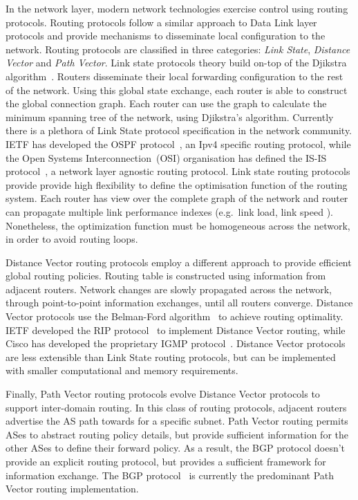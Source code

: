 In the network layer, modern network technologies exercise control using routing
protocols. Routing protocols follow a similar approach to Data Link layer
protocols and provide mechanisms to disseminate local configuration to the
network. Routing protocols are classified in three categories: \emph{Link
  State}, \emph{Distance Vector} and \emph{Path Vector}. Link state protocols
theory build on-top of the Djikstra algorithm~\cite{Djikstra1959}. Routers
disseminate their local forwarding configuration to the rest of the network.
Using this global state exchange, each router is able to construct the global
connection graph. Each router can use the graph to calculate the minimum
spanning tree of the network, using Djikstra's algorithm.  Currently there is a
plethora of Link State protocol specification in the network community.  IETF
has developed the OSPF protocol~\cite{RFC2328}, an Ipv4 specific routing protocol,
while the Open Systems Interconnection~(OSI) organisation has defined the IS-IS
protocol~\cite{RFC1142}, a network layer agnostic routing protocol.  Link state
routing protocols provide provide high flexibility to define the optimisation
function of the routing system.  Each router has view over the complete graph of
the network and router can propagate multiple link performance indexes
(e.g.~link load, link speed ).  Nonetheless, the optimization function must be
homogeneous across the network, in order to avoid routing loops.

Distance Vector routing protocols employ a different approach to provide
efficient global routing policies. Routing table is constructed using
information from adjacent routers. Network changes are slowly propagated across
the network, through point-to-point information exchanges, until all routers
converge.  Distance Vector protocols use the Belman-Ford
algorithm~\cite{bellman1956} to achieve routing optimality. IETF developed the
RIP  protocol~\cite{RFC2453} to implement Distance Vector routing, while Cisco
has developed the proprietary IGMP protocol~\cite{Rutgers1991}. Distance Vector
protocols are less extensible than Link State routing protocols, but can be
implemented with smaller computational and memory requirements.

Finally, Path Vector routing protocols evolve Distance
Vector protocols to support inter-domain routing. In this class of routing
protocols, adjacent routers advertise the AS path towards for a specific subnet. 
Path Vector routing permits ASes to abstract routing policy details, but provide
sufficient information for the other ASes to define their forward policy. As a
result, the BGP protocol doesn't provide an explicit routing protocol, but
provides a sufficient framework for information exchange.  The BGP
protocol~\cite{RFC1265} is currently the predominant Path Vector routing
implementation.

